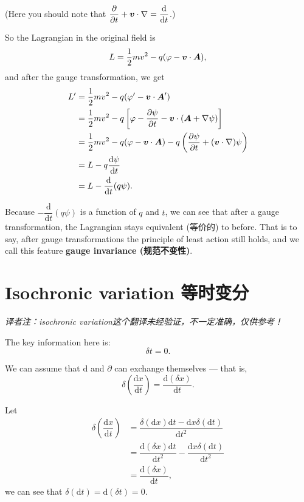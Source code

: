 (Here you should note that
\(\displaystyle {\partial \over \partial t} + \boldsymbol{v} \cdot \nabla = \frac{\mathrm{d}}{\mathrm{d}t}\).)

So the Lagrangian in the original field is
\[L = {1 \over 2} mv^2 - q(\varphi - \boldsymbol{v} \cdot \boldsymbol{A}),\]
and after the gauge transformation, we get \begin{align*}
    L' & = {1 \over 2} m v^2 - q(\varphi' - \boldsymbol{v} \cdot \boldsymbol{A}') \\
    & = {1 \over 2} m v^2 - q \left[ \varphi - {\partial \psi \over \partial t} - \boldsymbol{v} \cdot \left( \boldsymbol{A} + \nabla \psi \right) \right] \\
    & = {1 \over 2} m v^2 - q(\varphi - \boldsymbol{v} \cdot \boldsymbol{A}) - q \left( {\partial \psi \over \partial t} + (\boldsymbol{v} \cdot \nabla) \psi \right) \\
    & = L - q \frac{\mathrm{d} \psi}{\mathrm{d}t} \\
    & = L - \frac{\mathrm{d}}{\mathrm{d}t} (q \psi).
\end{align*}

Because \(- \dfrac{\mathrm{d}}{\mathrm{d}t} (q \psi)\) is a function of
\(q\) and \(t\), we can see that after a gauge transformation, the
Lagrangian stays equivalent (等价的) to before. That is to say, after
gauge transformations the principle of least action still holds, and we
call this feature \textbf{gauge invariance (规范不变性)}.

\section{Isochronic variation
等时变分}\label{isochronic-variation-ux7b49ux65f6ux53d8ux5206}

\emph{译者注：isochronic
variation这个翻译未经验证，不一定准确，仅供参考！}

The key information here is: \[\delta t = 0.\]

We can assume that \(\mathrm{d}\) and \(\partial\) can exchange
themselves --- that is,
\[\delta \left( \dfrac{\mathrm{d}x}{\mathrm{d}t} \right) = \dfrac{\mathrm{d} (\delta x)}{\mathrm{d}t}.\]

Let
\begin{align*} \delta \left( \dfrac{\mathrm{d}x}{\mathrm{d}t} \right) & = \dfrac{ \delta (\mathrm{d} x) \mathrm{d} t - \mathrm{d} x \delta (\mathrm{d} t)}{\mathrm{d} t^2} \\
    & = \dfrac{\mathrm{d} (\delta x) \mathrm{d} t}{\mathrm{d} t^2} - \dfrac{\mathrm{d} x \delta (\mathrm{d}t)}{\mathrm{d} t^2} \\
    & = \dfrac{\mathrm{d} (\delta x)}{\mathrm{d} t},
\end{align*} we can see that
\(\delta (\mathrm{d}t) = \mathrm{d} (\delta t) = 0\).

